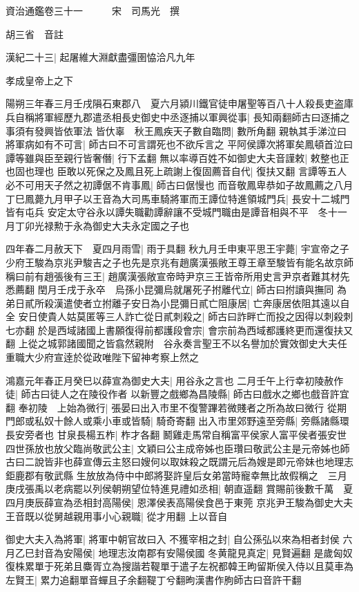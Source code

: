 資治通鑑卷三十一　　　宋　司馬光　撰

胡三省　音註

漢紀二十三|{
	起屠維大淵獻盡彊圉恊洽凡九年}


孝成皇帝上之下

陽朔三年春三月壬戌隕石東郡八　夏六月潁川鐵官徒申屠聖等百八十人殺長吏盗庫兵自稱將軍經歷九郡遣丞相長史御史中丞逐捕以軍興從事|{
	長知兩翻師古曰逐捕之事須有發興皆依軍法}
皆㐲辜　秋王鳳疾天子數自臨問|{
	數所角翻}
親執其手涕泣曰將軍病如有不可言|{
	師古曰不可言謂死也不欲斥言之}
平阿侯譚次將軍矣鳳頓首泣曰譚等雖與臣至親行皆奢僭|{
	行下孟翻}
無以率導百姓不如御史大夫音謹敕|{
	敕整也正也固也理也}
臣敢以死保之及鳳且死上疏謝上復固薦音自代|{
	復扶又翻}
言譚等五人必不可用天子然之初譚倨不肯事鳳|{
	師古曰倨慢也}
而音敬鳳卑恭如子故鳳薦之八月丁巳鳳薨九月甲子以王音為大司馬車騎將軍而王譚位特進領城門兵|{
	長安十二城門皆有屯兵}
安定太守谷永以譚失職勸譚辭讓不受城門職由是譚音相與不平　冬十一月丁卯光禄勲于永為御史大夫永定國之子也

四年春二月赦天下　夏四月雨雪|{
	雨于具翻}
秋九月壬申東平思王宇薨|{
	宇宣帝之子}
少府王駿為京兆尹駿吉之子也先是京兆有趙廣漢張敞王尊王章至駿皆有能名故京師稱曰前有趙張後有三王|{
	趙廣漢張敞宣帝時尹京三王皆帝所用史言尹京者難其材先悉薦翻}
閏月壬戌于永卒　烏孫小昆彌烏就屠死子拊離代立|{
	師古曰拊讀與撫同}
為弟日貳所殺漢遣使者立拊離子安日為小昆彌日貳亡阻康居|{
	亡奔康居依阻其遠以自全}
安日使貴人姑莫匿等三人詐亡從日貳刺殺之|{
	師古曰詐畔亡而投之因得以刺殺刺七亦翻}
於是西域諸國上書願復得前都護段會宗|{
	會宗前為西域都護終更而還復扶又翻}
上從之城郭諸國聞之皆翕然親附　谷永奏言聖王不以名譽加於實效御史大夫任重職大少府宣逹於從政唯陛下留神考察上然之

鴻嘉元年春正月癸巳以薛宣為御史大夫|{
	用谷永之言也}
二月壬午上行幸初陵赦作徒|{
	師古曰徒人之在陵役作者}
以新豐之戲鄉為昌陵縣|{
	師古曰戲水之鄉也戲音許宜翻}
奉初陵　上始為微行|{
	張晏曰出入市里不復警蹕若微賤者之所為故曰微行}
從期門郎或私奴十餘人或乘小車或皆騎|{
	騎奇寄翻}
出入市里郊野遠至旁縣|{
	旁縣諸縣環長安旁者也}
甘泉長楊五柞|{
	柞才各翻}
鬭雞走馬常自稱富平侯家人富平侯者張安世四世孫放也放父臨尚敬武公主|{
	文穎曰公主成帝姊也臣瓚曰敬武公主是元帝姊也師古曰二說皆非也薛宣傳云主怒曰嫂何以取妺殺之既謂元后為嫂是即元帝妹也地理志鉅鹿郡有敬武縣}
生放放為侍中中郎將娶許皇后女弟當時寵幸無比故假稱之　三月庚戌張禹以老病罷以列侯朝朔望位特進見禮如丞相|{
	朝直遥翻}
賞賜前後數千萬　夏四月庚辰薛宣為丞相封高陽侯|{
	恩澤侯表高陽侯食邑于東莞}
京兆尹王駿為御史大夫王音既以從舅越親用事小心親職|{
	從才用翻}
上以音自

御史大夫入為將軍|{
	將軍中朝官故曰入}
不獲宰相之封|{
	自公孫弘以來為相者封侯}
六月乙巳封音為安陽侯|{
	地理志汝南郡有安陽侯國}
冬黄龍見真定|{
	見賢遍翻}
是歲匈奴復株累單于死弟且麋胥立為搜諧若鞮單于遣子左祝都韓王昫留斯侯入侍以且莫車為左賢王|{
	累力追翻單音蟬且子余翻鞮丁兮翻昫漢書作胊師古曰音許干翻}


